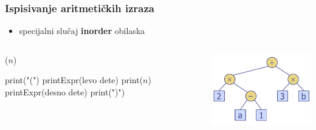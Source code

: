 \documentclass[compress,aspectratio=169]{beamer}
\begin{document}
\begin{frame}[fragile]
  \frametitle{Ispisivanje aritmetičkih izraza}
  \begin{itemize}
    \item specijalni slučaj \textbf{inorder} obilaska
  \end{itemize}
\begin{columns}
  \begin{column}[c]{5cm}
    ($n$)
    \begin{algorithmic}
      \STATE print("(")
      \STATE printExpr(levo dete)
    \ENDIF
    \STATE print($n$)
      \STATE printExpr(desno dete)
      \STATE print(")")
    \ENDIF
    \end{algorithmic}
  \end{column}
  \begin{column}[c]{6cm}
    \begin{center}
      \includegraphics[width=6cm]{asp-08-pic10.png}
    \end{center}
  \end{column}
\end{columns}
\end{frame}
\end{document}
